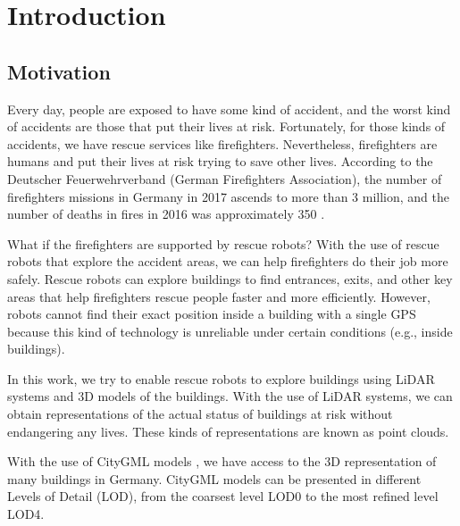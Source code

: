 

    \chapter{Introduction}

    \section{Motivation}
    
        Every day, people are exposed to have some kind of accident, and the worst kind of accidents are those that put their lives at risk.
        Fortunately, for those kinds of accidents, we have rescue services like firefighters.
        Nevertheless, firefighters are humans and put their lives at risk trying to save other lives.
        According to the Deutscher Feuerwehrverband (German Firefighters Association), the number of firefighters missions in Germany in 2017 
        ascends to more than 3 million, and the number of deaths in fires in 2016 was approximately 350 \cite{DeutscherFeuerweherverband_online}.
        \par
        What if the firefighters are supported by rescue robots?
        With the use of rescue robots that explore the accident areas, we can help firefighters do their job more safely.
        Rescue robots can explore buildings to find entrances, exits, and other key areas that help firefighters rescue people faster and more efficiently.
        However, robots cannot find their exact position inside a building with a single GPS because this kind of technology is unreliable under certain conditions 
        (e.g., inside buildings).
        \par
        In this work, we try to enable rescue robots to explore buildings using LiDAR systems and 3D models of the buildings.
        With the use of LiDAR systems, we can obtain representations of the actual status of buildings at risk without endangering any lives. 
        These kinds of representations are known as point clouds.
        \par
        With the use of CityGML models \cite{Groger_2012_OGC}, we have access to the 3D representation of many buildings in Germany.
        CityGML models can be presented in different Levels of Detail (LOD), from the coarsest level LOD0 to the most refined level LOD4.

